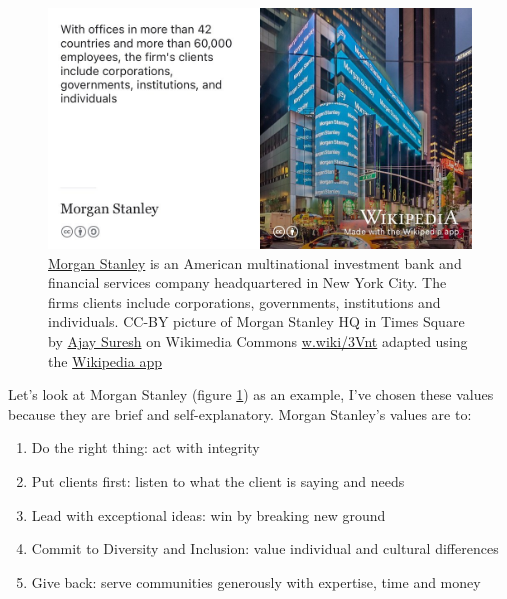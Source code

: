 \documentclass[
]{book}
\providecommand{\tightlist}{%
  \setlength{\itemsep}{0pt}\setlength{\parskip}{0pt}}
\begin{document}
\begin{figure}

{\centering \includegraphics[width=1\linewidth]{images/morgan-stanley-times-square} 

}

\caption{\href{https://en.wikipedia.org/wiki/Morgan_Stanley}{Morgan Stanley} is an American multinational investment bank and financial services company headquartered in New York City. The firms clients include corporations, governments, institutions and individuals. CC-BY picture of Morgan Stanley HQ in Times Square by \href{https://flickr.com/photos/ajay_suresh/}{Ajay Suresh} on Wikimedia Commons \href{https://w.wiki/3Vnt}{w.wiki/3Vnt} adapted using the \href{https://apps.apple.com/gb/app/wikipedia/id324715238}{Wikipedia app}}\label{fig:morgan-stanley-fig}
\end{figure}



Let's look at Morgan Stanley (figure \ref{fig:morgan-stanley-fig}) as an example, I've chosen these values because they are brief and self-explanatory. Morgan Stanley's values are to:

\begin{enumerate}
\def\labelenumi{\arabic{enumi}.}
\tightlist
\item
  Do the right thing: act with integrity
\item
  Put clients first: listen to what the client is saying and needs
\item
  Lead with exceptional ideas: win by breaking new ground
\item
  Commit to Diversity and Inclusion: value individual and cultural differences
\item
  Give back: serve communities generously with expertise, time and money
\end{enumerate}
\end{document}

